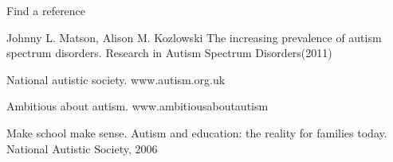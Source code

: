 \documentclass[11pt]{report}
\begin{document}
\begin{thebibliography}{9}

Find a reference

Johnny L. Matson, Alison M. Kozlowski
The increasing prevalence of autism spectrum disorders. Research in Autism Spectrum Disorders(2011)

National autistic society. www.autism.org.uk

Ambitious about autism. www.ambitiousaboutautism

Make school make sense. Autism and education: the reality for families today. National Autistic Society, 2006


\end{thebibliography}
\end{document}
